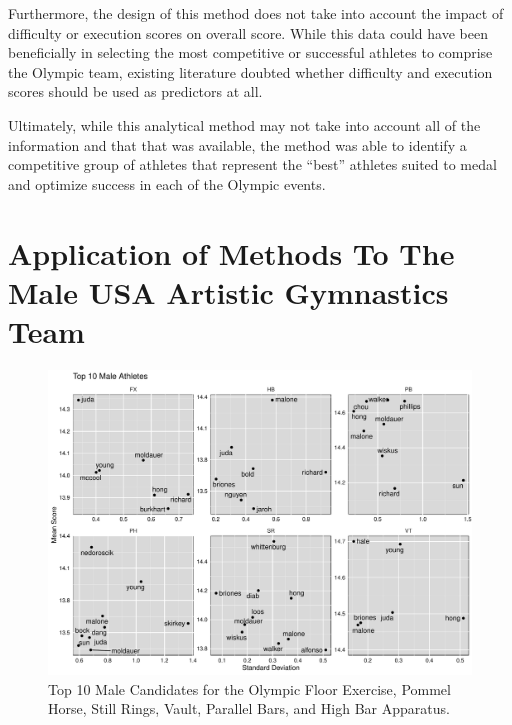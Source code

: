 \documentclass[12pt]{article}
\begin{document}
Furthermore, the design of this method does not take into account the impact of difficulty or execution scores on 
overall score. While this data could have been beneficially in selecting the most competitive or successful athletes 
to comprise the Olympic team, existing literature doubted whether difficulty and execution scores should be 
used as predictors at all.

Ultimately, while this analytical method may not take into account all of the information and that that was available, 
the method was able to identify a competitive group of athletes that represent the ``best'' athletes suited 
to medal and optimize success in each of the Olympic events.


\appendix

\section{Application of Methods To The Male USA Artistic Gymnastics Team}
\label{appendix:men}

\begin{figure}
  \centering
  \includegraphics[scale=0.5]{FinalMaleApparatusPlot.pdf}
  \caption{Top 10 Male Candidates for the Olympic Floor Exercise, Pommel Horse, Still Rings, Vault, Parallel Bars, 
  and High Bar Apparatus.}
  \label{fig:MA}
\end{figure}
\end{document}
